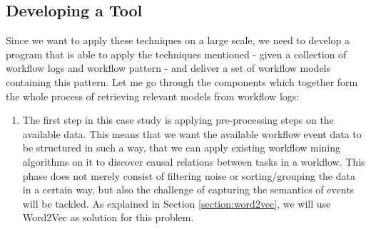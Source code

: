 \documentclass[a4paper,11pt]{article}
\begin{document}
\subsection{Developing a Tool}
Since we want to apply these techniques on a large scale, we need to develop a program that is able to apply the techniques mentioned - given a collection of workflow logs and workflow pattern - and deliver a set of workflow models containing this pattern. Let me go through the components which together form the whole process of retrieving relevant models from workflow logs:

\begin{enumerate}
\item The first step in this case study is applying pre-processing steps on the available data. This means that we want the available workflow event data to be structured in such a way, that we can apply existing workflow mining algorithms on it to discover causal relations between tasks in a workflow. This phase does not merely consist of filtering noise or sorting/grouping the data in a certain way, but also the challenge of capturing the semantics of events will be tackled. As explained in Section \ref{section:word2vec}, we will use Word2Vec \cite{Mikolov2013aWord2Vec,Mikolov2013bWord2Vec} as solution for this problem.


\end{enumerate}
\end{document}
